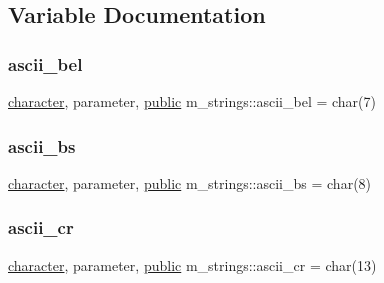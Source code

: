 \subsection{Variable Documentation}
\mbox{\label{namespacem__strings_ae939ea755cfa377c5ed5f09ba8b0e923}} 
\subsubsection{\texorpdfstring{ascii\+\_\+bel}{ascii\_bel}}
{\footnotesize\ttfamily \hyperlink{option__stopwatch_83_8txt_abd4b21fbbd175834027b5224bfe97e66}{character}, parameter, \hyperlink{M__stopwatch_83_8txt_a2f74811300c361e53b430611a7d1769f}{public} m\+\_\+strings\+::ascii\+\_\+bel = char(7)}

\mbox{\label{namespacem__strings_a6d4b461b6fba6d81e0cee7b6e579c77b}} 
\subsubsection{\texorpdfstring{ascii\+\_\+bs}{ascii\_bs}}
{\footnotesize\ttfamily \hyperlink{option__stopwatch_83_8txt_abd4b21fbbd175834027b5224bfe97e66}{character}, parameter, \hyperlink{M__stopwatch_83_8txt_a2f74811300c361e53b430611a7d1769f}{public} m\+\_\+strings\+::ascii\+\_\+bs = char(8)}

\mbox{\label{namespacem__strings_a1f58b48efb41665079ced6de505a3b65}} 
\subsubsection{\texorpdfstring{ascii\+\_\+cr}{ascii\_cr}}
{\footnotesize\ttfamily \hyperlink{option__stopwatch_83_8txt_abd4b21fbbd175834027b5224bfe97e66}{character}, parameter, \hyperlink{M__stopwatch_83_8txt_a2f74811300c361e53b430611a7d1769f}{public} m\+\_\+strings\+::ascii\+\_\+cr = char(13)}

\mbox{\label{namespacem__strings_a6e9a1f921d2bb4a14a9b50a3b8f96288}} 
